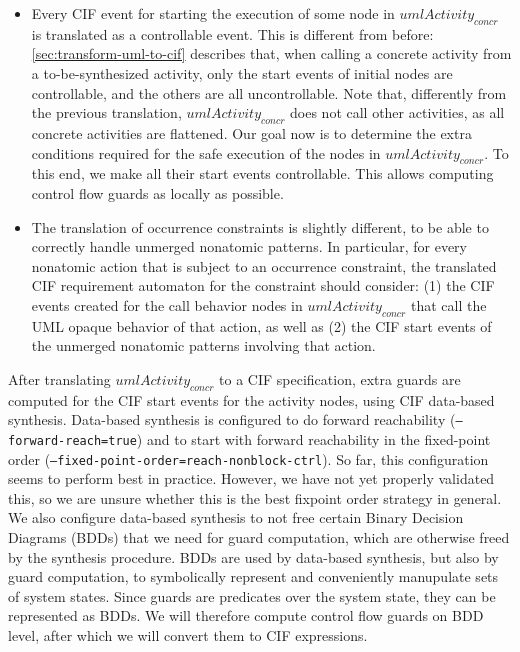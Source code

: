 \documentclass{article}
\newcommand{\var}[1]{\ensuremath{\mathit{#1}}}
\theoremstyle{definition}
\begin{document}
\begin{itemize}
	To achieve that, we require that the start events of all action nodes are disabled whenever the ``without structure'' variant of the activity postcondition holds, and that the start events of all control nodes are disabled whenever the stronger ``with structure'' variant of the postcondition holds.
	\item Every CIF event for starting the execution of some node in \var{umlActivity_{concr}} is translated as a controllable event.
	This is different from before: \autoref{sec:transform-uml-to-cif} describes that, when calling a concrete activity from a to-be-synthesized activity, only the start events of initial nodes are controllable, and the others are all uncontrollable.
	Note that, differently from the previous translation, \var{umlActivity_{concr}} does not call other activities, as all concrete activities are flattened.
	Our goal now is to determine the extra conditions required for the safe execution of the nodes in \var{umlActivity_{concr}}. 
	To this end, we make all their start events controllable.
	This allows computing control flow guards as locally as possible.
	\item The translation of occurrence constraints is slightly different, to be able to correctly handle unmerged nonatomic patterns.
	In particular, for every nonatomic action that is subject to an occurrence constraint, the translated CIF requirement automaton for the constraint should consider: (1) the CIF events created for the call behavior nodes in \var{umlActivity_{concr}} that call the UML opaque behavior of that action, as well as (2) the CIF start events of the unmerged nonatomic patterns involving that action.
\end{itemize}

After translating \var{umlActivity_{concr}} to a CIF specification, extra guards are computed for the CIF start events for the activity nodes, using CIF data-based synthesis.
Data-based synthesis is configured to do forward reachability (\texttt{--forward-reach=true}) and to start with forward reachability in the fixed-point order (\texttt{--fixed-point-order=reach-nonblock-ctrl}).
So far, this configuration seems to perform best in practice.
However, we have not yet properly validated this, so we are unsure whether this is the best fixpoint order strategy in general.
We also configure data-based synthesis to not free certain Binary Decision Diagrams (BDDs) that we need for guard computation, which are otherwise freed by the synthesis procedure.
BDDs are used by data-based synthesis, but also by guard computation, to symbolically represent and conveniently manupulate sets of system states.
Since guards are predicates over the system state, they can be represented as BDDs.
We will therefore compute control flow guards on BDD level, after which we will convert them to CIF expressions.
\end{document}
